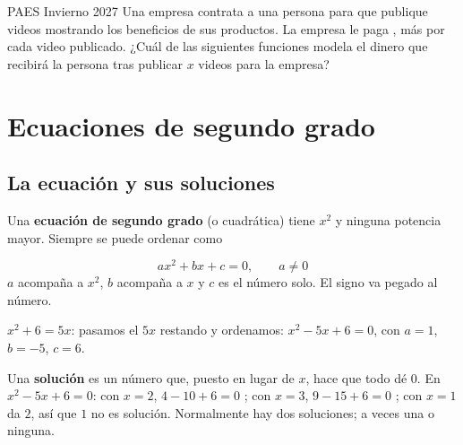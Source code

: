 \begin{elejemplo}{PAES Invierno 2027}
Una empresa contrata a una persona para que publique videos mostrando los beneficios de sus productos. La empresa le paga , más  por cada video publicado. ¿Cuál de las siguientes funciones modela el dinero que recibirá la persona tras publicar $x$ videos para la empresa?
\end{elejemplo}

\section{Ecuaciones de segundo grado}

\subsection{La ecuación y sus soluciones}
Una \textbf{ecuación de segundo grado} (o cuadrática) tiene $x^2$ y ninguna potencia mayor. Siempre se puede ordenar como
\begin{clave} $$ax^2 + bx + c = 0,\qquad a \neq 0$$ $a$ acompaña a $x^2$, $b$ acompaña a $x$ y $c$ es el número solo. El signo va pegado al número.\end{clave}
\begin{ejemplo} $x^2 + 6 = 5x$: pasamos el $5x$ restando y ordenamos: $x^2 - 5x + 6 = 0$, con $a = 1$, $b = -5$, $c = 6$.\end{ejemplo}
Una \textbf{solución} es un número que, puesto en lugar de $x$, hace que todo dé $0$. En $x^2 - 5x + 6 = 0$: con $x = 2$, $4 - 10 + 6 = 0$ \checkmark; con $x = 3$, $9 - 15 + 6 = 0$ \checkmark; con $x = 1$ da $2$, así que $1$ no es solución. Normalmente hay dos soluciones; a veces una o ninguna.

